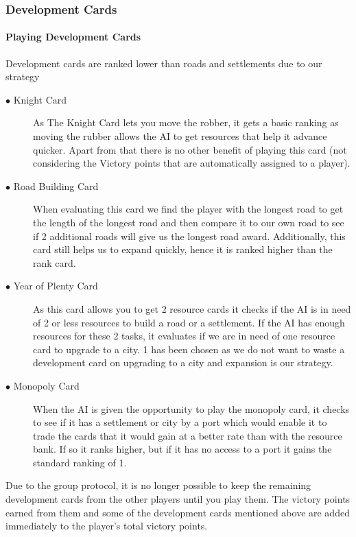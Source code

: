 \documentclass[a4paper,doc]{apa6}
\begin{document}
\subsubsection{Development Cards}

\paragraph{Playing Development Cards}
Development cards are ranked lower than roads and settlements due to our strategy

\begin{description}
\item[$\bullet$ Knight Card] As The Knight Card lets you move the robber, it gets a basic ranking as moving the rubber allows the AI to get resources that help it advance quicker. Apart from that there is no other benefit of playing this card (not considering the Victory points that are automatically assigned to a player).
\item[$\bullet$ Road Building Card] When evaluating this card we find the player with the longest road to get the length of the longest road and then compare it to our own road to see if 2 additional roads will give us the longest road award. Additionally, this card still helps us to expand quickly, hence it is ranked higher than the rank card.
\item[$\bullet$ Year of Plenty Card] As this card allows you to get 2 resource cards it checks if the AI is in need of 2 or less resources to build a road or a settlement. If the AI has enough resources for these 2 tasks, it evaluates if we are in need of one resource card to upgrade to a city. 1 has been chosen as we do not want to waste a development card on upgrading to a city and expansion is our strategy.
\item[$\bullet$ Monopoly Card] When the AI is given the opportunity to play the monopoly card, it checks to see if it has a settlement or city by a port which would enable it to trade the cards that it would gain at a better rate than with the resource bank. If so it ranks higher, but if it has no access to a port it gains the standard ranking of 1.
\end{description}

Due to the group protocol, it is no longer possible to keep the remaining development cards from the other players until you play them. The victory points earned from them and some of the development cards mentioned above are added immediately to the player’s total victory points.
\end{document}
